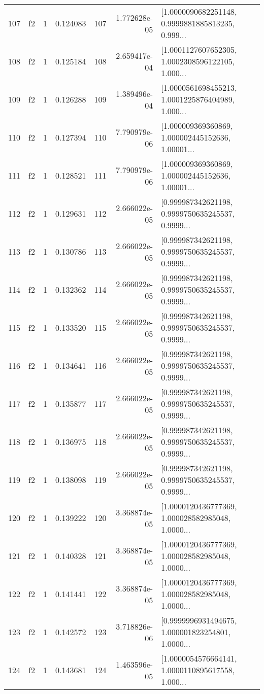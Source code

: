 \begin{tabular}{lllrlrl}
107 &  f2 &   1 &  0.124083 &  107 &  1.772628e-05 &  [1.0000090682251148, 0.9999881885813235, 0.999... \\
108 &  f2 &   1 &  0.125184 &  108 &  2.659417e-04 &  [1.0001127607652305, 1.0002308596122105, 1.000... \\
109 &  f2 &   1 &  0.126288 &  109 &  1.389496e-04 &  [1.0000561698455213, 1.0001225876404989, 1.000... \\
110 &  f2 &   1 &  0.127394 &  110 &  7.790979e-06 &  [1.000009369360869, 1.000002445152636, 1.00001... \\
111 &  f2 &   1 &  0.128521 &  111 &  7.790979e-06 &  [1.000009369360869, 1.000002445152636, 1.00001... \\
112 &  f2 &   1 &  0.129631 &  112 &  2.666022e-05 &  [0.999987342621198, 0.9999750635245537, 0.9999... \\
113 &  f2 &   1 &  0.130786 &  113 &  2.666022e-05 &  [0.999987342621198, 0.9999750635245537, 0.9999... \\
114 &  f2 &   1 &  0.132362 &  114 &  2.666022e-05 &  [0.999987342621198, 0.9999750635245537, 0.9999... \\
115 &  f2 &   1 &  0.133520 &  115 &  2.666022e-05 &  [0.999987342621198, 0.9999750635245537, 0.9999... \\
116 &  f2 &   1 &  0.134641 &  116 &  2.666022e-05 &  [0.999987342621198, 0.9999750635245537, 0.9999... \\
117 &  f2 &   1 &  0.135877 &  117 &  2.666022e-05 &  [0.999987342621198, 0.9999750635245537, 0.9999... \\
118 &  f2 &   1 &  0.136975 &  118 &  2.666022e-05 &  [0.999987342621198, 0.9999750635245537, 0.9999... \\
119 &  f2 &   1 &  0.138098 &  119 &  2.666022e-05 &  [0.999987342621198, 0.9999750635245537, 0.9999... \\
120 &  f2 &   1 &  0.139222 &  120 &  3.368874e-05 &  [1.0000120436777369, 1.000028582985048, 1.0000... \\
121 &  f2 &   1 &  0.140328 &  121 &  3.368874e-05 &  [1.0000120436777369, 1.000028582985048, 1.0000... \\
122 &  f2 &   1 &  0.141441 &  122 &  3.368874e-05 &  [1.0000120436777369, 1.000028582985048, 1.0000... \\
123 &  f2 &   1 &  0.142572 &  123 &  3.718826e-06 &  [0.9999996931494675, 1.000001823254801, 1.0000... \\
124 &  f2 &   1 &  0.143681 &  124 &  1.463596e-05 &  [1.0000054576664141, 1.0000110895617558, 1.000... \\

\end{tabular}
